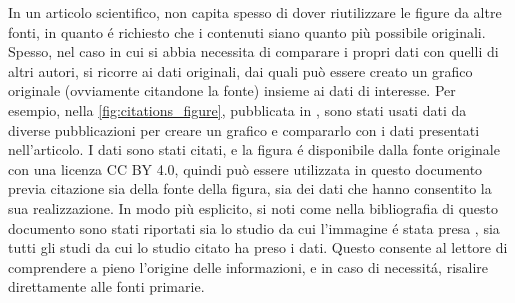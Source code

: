 \documentclass[9pt,a4paper,twoside]{rho-class/rho}
\begin{document}
In un articolo scientifico, non capita spesso di dover riutilizzare le figure da altre fonti, in quanto é richiesto che i contenuti siano quanto più possibile originali. Spesso, nel caso in cui si abbia necessita di comparare i propri dati con quelli di altri autori, si ricorre ai dati originali, dai quali può essere creato un grafico originale (ovviamente citandone la fonte) insieme ai dati di interesse. Per esempio, nella \autoref{fig:citations_figure}, pubblicata in \cite{rovere_higher_2020}, sono stati usati dati da diverse pubblicazioni per creare un grafico e compararlo con i dati presentati nell'articolo. I dati sono stati citati, e la figura é disponibile dalla fonte originale con una licenza CC BY 4.0, quindi può essere utilizzata in questo documento previa citazione sia della fonte della figura, sia dei dati che hanno consentito la sua realizzazione. In modo più esplicito, si noti come nella bibliografia di questo documento sono stati riportati sia lo studio da cui l'immagine é stata presa \parencite{rovere_higher_2020}, sia tutti gli studi da cui lo studio citato ha preso i dati. Questo consente al lettore di comprendere a pieno l'origine delle informazioni, e in caso di necessitá, risalire direttamente alle fonti primarie.
\end{document}
